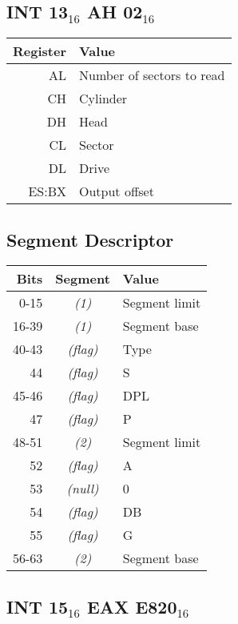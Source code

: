 \documentclass{article}
\begin{document}
\subsection{INT 13$_{16}$ AH 02$_{16}$}
\label{int 13 ah 02}

\begin{tabular}{|r|l|}
	\hline
	\textbf{Register} & \textbf{Value} \\
	\hline
	AL & Number of sectors to read \\
	\hline
	CH & Cylinder \\
	\hline
	DH & Head \\
	\hline
	CL & Sector \\
	\hline
	DL & Drive \\
	\hline
	ES:BX & Output offset \\
	\hline
\end{tabular}

\subsection{Segment Descriptor}
\label{gdt}

\begin{tabular}{|r|c|l|}
	\hline
	\textbf{Bits} & \textbf{Segment} & \textbf{Value} \\
	\hline
	0-15 & \emph{(1)} & Segment limit \\
	\hline
	16-39 & \emph{(1)} & Segment base \\
	\hline
	40-43 & \emph{(flag)} & Type \\
	\hline
	44 & \emph{(flag)} & S \\
	\hline
	45-46 & \emph{(flag)} & DPL \\
	\hline
	47 & \emph{(flag)} & P \\
	\hline
	48-51 & \emph{(2)} & Segment limit \\
	\hline
	52 & \emph{(flag)} & A \\
	\hline
	53 & \emph{(null)} & 0 \\
	\hline
	54 & \emph{(flag)} & DB \\
	\hline
	55 & \emph{(flag)} & G \\
	\hline
	56-63 & \emph{(2)} & Segment base \\
	\hline
\end{tabular}

\subsection{INT 15$_{16}$ EAX E820$_{16}$}
\label{int 15 0xe820}
\end{document}
